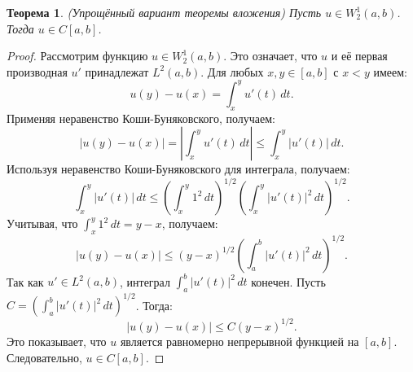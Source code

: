 \documentclass[9pt]{article}
\newtheorem{theorem}{Теорема} %
\begin{document}
	\begin{theorem} (Упрощённый вариант теоремы вложения) \newline
		Пусть \( u \in W^1_2(a,b) \). Тогда \( u \in C[a,b] \).
	\end{theorem}
	\begin{proof}
 Рассмотрим функцию \( u \in W^1_2(a,b) \). Это означает, что \( u \) и её первая производная \( u' \) принадлежат \( L^2(a,b) \).
Для любых \( x, y \in [a,b] \) с \( x < y \) имеем:
	\[
	u(y) - u(x) = \int_x^y u'(t) \, dt.
	\]
 Применяя неравенство Коши-Буняковского, получаем:
	\[
	|u(y) - u(x)| = \left| \int_x^y u'(t) \, dt \right| \leq \int_x^y |u'(t)| \, dt.
	\]
Используя неравенство Коши-Буняковского для интеграла, получаем:
	\[
	\int_x^y |u'(t)| \, dt \leq \left( \int_x^y 1^2 \, dt \right)^{1/2} \left( \int_x^y |u'(t)|^2 \, dt \right)^{1/2}.
	\] Учитывая, что \( \int_x^y 1^2 \, dt = y - x \), получаем:
	\[
	|u(y) - u(x)| \leq (y - x)^{1/2} \left( \int_a^b |u'(t)|^2 \, dt \right)^{1/2}.
	\]
	Так как \( u' \in L^2(a,b) \), интеграл \( \int_a^b |u'(t)|^2 \, dt \) конечен. Пусть \( C = \left( \int_a^b |u'(t)|^2 \, dt \right)^{1/2} \). Тогда:
	\[
	|u(y) - u(x)| \leq C (y - x)^{1/2}.
	\]
	Это показывает, что \( u \) является равномерно непрерывной функцией на \([a,b]\). Следовательно, \( u \in C[a,b] \).
	\end{proof}
\end{document}
